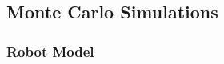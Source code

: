 \documentclass[runningheads]{llncs}
\begin{document}






\subsection{Monte Carlo Simulations}  \label{sec:sim}



\subsubsection{Robot Model}
\end{document}

